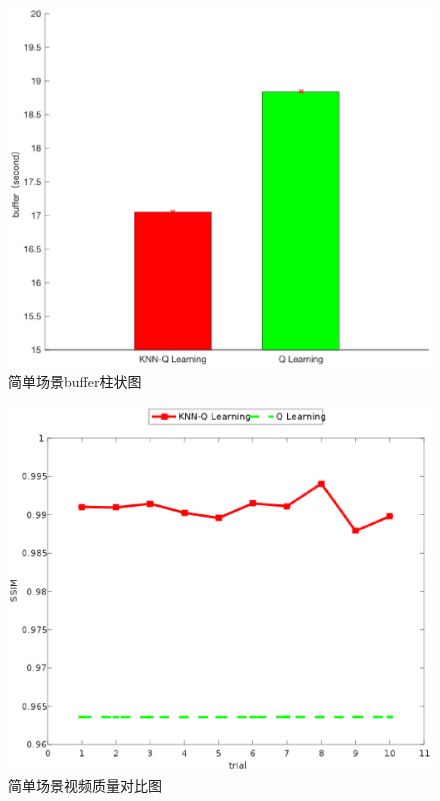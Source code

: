 \documentclass[twocolumn]{article}
\begin{document}
\begin{figure}[htbp]
\centering
\includegraphics[width=\columnwidth]{simple_buffer_bar_graph}
\caption{简单场景buffer柱状图}
\label{simple_buffer_bar_graph}
\end{figure}
\begin{figure}[htbp]
\centering
\includegraphics[width=\columnwidth]{simple_ssim_compare}
\caption{简单场景视频质量对比图}
\label{simple_ssim_compare}
\end{figure}
\end{document}
